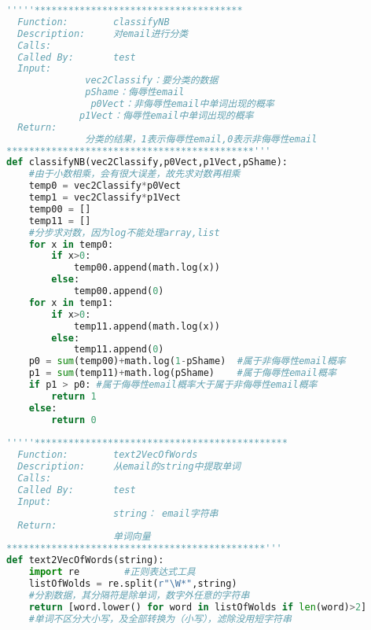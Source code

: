 \begin{lstlisting}[language=python]
'''''************************************* 
  Function:        classifyNB 
  Description:     对email进行分类 
  Calls:            
  Called By:       test 
  Input: 
              vec2Classify：要分类的数据 
              pShame：侮辱性email 
               p0Vect：非侮辱性email中单词出现的概率 
             p1Vect：侮辱性email中单词出现的概率 
  Return:           
              分类的结果，1表示侮辱性email,0表示非侮辱性email 
********************************************'''  
def classifyNB(vec2Classify,p0Vect,p1Vect,pShame):  
    #由于小数相乘，会有很大误差，故先求对数再相乘  
    temp0 = vec2Classify*p0Vect   
    temp1 = vec2Classify*p1Vect  
    temp00 = []   
    temp11 = []  
    #分步求对数，因为log不能处理array,list  
    for x in temp0:  
        if x>0:  
            temp00.append(math.log(x))   
        else:  
            temp00.append(0)  
    for x in temp1:  
        if x>0:  
            temp11.append(math.log(x))   
        else:  
            temp11.append(0)  
    p0 = sum(temp00)+math.log(1-pShame)  #属于非侮辱性email概率  
    p1 = sum(temp11)+math.log(pShame)    #属于侮辱性email概率  
    if p1 > p0: #属于侮辱性email概率大于属于非侮辱性email概率  
        return 1  
    else:  
        return 0  
  
'''''********************************************* 
  Function:        text2VecOfWords 
  Description:     从email的string中提取单词 
  Calls:            
  Called By:       test 
  Input: 
                   string： email字符串 
  Return:           
                   单词向量 
**********************************************'''  
def text2VecOfWords(string):  
    import re        #正则表达式工具  
    listOfWolds = re.split(r"\W*",string)  
    #分割数据，其分隔符是除单词，数字外任意的字符串   
    return [word.lower() for word in listOfWolds if len(word)>2]  
    #单词不区分大小写，及全部转换为（小写），滤除没用短字符串  
  

\end{lstlisting}
